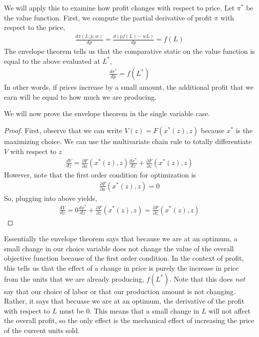 We will apply this to examine how profit changes with respect to price. Let $\pi^*$ be the value function. First, we compute the partial derivative of profit $\pi$ with respect to the price,
\begin{align*}
    \frac{d\pi(L; p, w)}{dp} = \frac{d(p f(L) - w L)}{dp} = f(L)
\end{align*}
The envelope theorem tells us that the comparative static on the value function is equal to the above evaluated at $L^*$, 
\begin{align*}
    \frac{d \pi^*}{dp} = f(L^*)
\end{align*}
In other words, if prices increase by a small amount, the additional profit that we earn will be equal to how much we are producing. 

We will now prove the envelope theorem in the single variable case.

\begin{proof}
    First, observe that we can write $V(z) = F(x^*(z), z)$ because $x^*$ is the maximizing choice. We can use the multivariate chain rule to totally differentiate $V$ with respect to $z$
    \begin{align*}
        \frac{dV}{dz} = \frac{\partial F}{\partial x}(x^*(z), z) \frac{d x^*}{dz} + \frac{\partial F}{\partial z}(x^*(z), z)
    \end{align*}
    However, note that the first order condition for optimization is
    \begin{align*}
        \frac{\partial F}{\partial x}(x^*(z), z) = 0
    \end{align*}
    So, plugging into above yields,
    \begin{align*}
        \frac{dV}{dz} = 0 \frac{d x^*}{dz} + \frac{\partial F}{\partial z}(x^*(z), z) = \frac{\partial F}{\partial z}(x^*(z), z)
    \end{align*}
\end{proof}

Essentially the envelope theorem says that because we are at an optimum, a small change in our choice variable does not change the value of the overall objective function because of the first order condition. In the context of profit, this tells us that the effect of a change in price is purely the increase in price from the units that we are already producing, $f(L^*)$. Note that this does \emph{not} say that our choice of labor or that our production amount is not changing. Rather, it says that becuase we are at an optimum, the derivative of the profit with respect to $L$ must be 0. This means that a small change in $L$ will not affect the overall profit, so the only effect is the mechanical effect of increasing the price of the current units sold.

